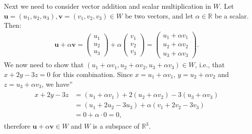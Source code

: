 \documentclass[letterpaper,10pt,english]{jupyterBook}
\begin{document}
\sphinxAtStartPar
Next we need to consider vector addition and scalar multiplication in \(W\). Let \(\mathbf{u} = (u_1, u_2, u_3), \mathbf{v} = (v_1, v_2, v_3) \in W\) be two vectors, and let \(\alpha \in \mathbb{R}\) be a scalar. Then:
\begin{equation*}
\begin{split} \mathbf{u} + \alpha \mathbf{v} = \begin{pmatrix} u_1 \\ u_2 \\ u_3 \end{pmatrix} + \alpha \begin{pmatrix} v_1 \\ v_2 \\ v_3 \end{pmatrix} = \begin{pmatrix} u_1 + \alpha v_1 \\ u_2 + \alpha v_2 \\ u_3 + \alpha v_3 \end{pmatrix}. \end{split}
\end{equation*}
\sphinxAtStartPar
We now need to show that \((u_1 + \alpha v_1, u_2 + \alpha v_2, u_3 + \alpha v_3)  \in W\), i.e., that \(x + 2y - 3z = 0\) for this combination. Since \(x = u_1 + \alpha v_1\), \(y = u_2 + \alpha v_2\) and \(z = u_3 + \alpha v_3\), we have”
\begin{equation*}
\begin{split} \begin{align*}
    x + 2y - 3z &= (u_1 + \alpha v_1) + 2(u_2 + \alpha v_2) - 3(u_3 + \alpha v_3) \\
    &= (u_1 + 2u_2 - 3u_3) + \alpha (v_1 + 2v_2 - 3v_3) \\
    &= 0 + \alpha \cdot 0 = 0,
\end{align*} \end{split}
\end{equation*}
\sphinxAtStartPar
therefore \(\mathbf{u} + \alpha \mathbf{v} \in W\) and \(W\) is a subspace of \(\mathbb{R}^3\).
\end{document}

